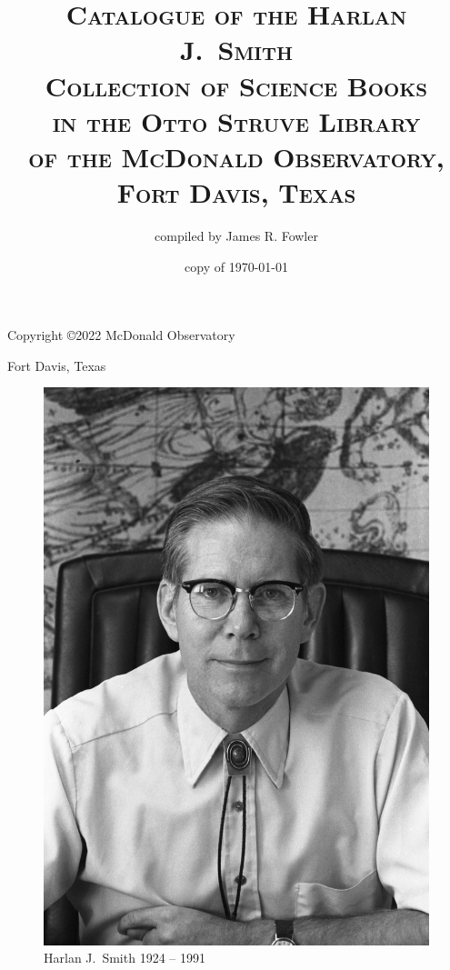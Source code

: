 \documentclass[letterpaper]{book}
\begin{document}
\frontmatter
\pagestyle{empty}
\title{\textsc{Catalogue of the Harlan J.\ Smith \\
    Collection of Science Books \\
    in the Otto Struve Library \\
    of the McDonald Observatory, \\
  Fort Davis, Texas}}
\author{compiled by James R. Fowler}
\date{copy of \today}
\maketitle
\newpage
\vspace*{5 in}
\centerline{Copyright \copyright 2022 McDonald Observatory}
\centerline{Fort Davis, Texas}
\newpage

\pagestyle{plain}
\begin{figure}[t]
  \centering
  \includegraphics{hjs_photo.jpg}
  Harlan J.~Smith 1924 -- 1991
  \label{fig:hjs}
\end{figure}
\clearpage
\mbox{}
\thispagestyle{empty}
\newpage
\end{document}
